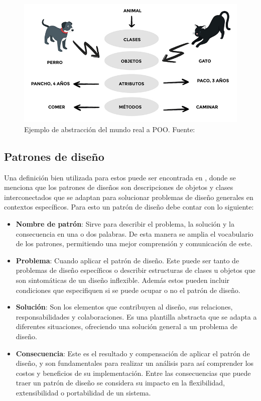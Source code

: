 \begin{figure}[!ht]
	\centering
	\captionsetup{justification=centering}
	\includegraphics[scale=0.6]{images/POO.png}
	\caption[Ejemplo de abstracción del mundo real a POO.]{Ejemplo de abstracción del mundo real a POO. Fuente: \citep{poo_image}}
	\label{fig:poo_image}
\end{figure}

\subsection{Patrones de diseño}
\label{subsec:patrones}

Una definición bien utilizada para estos puede ser encontrada en  \cite{gamma2002patrones}, donde se menciona que los patrones de diseños son descripciones de objetos y clases interconectados que se adaptan para solucionar problemas de diseño generales en contextos específicos. Para esto un patrón de diseño debe contar con lo siguiente: 

\begin{itemize}
    \item \textbf{Nombre de patrón}: Sirve para describir el problema, la solución y la consecuencia en una o dos palabras. De esta manera se amplia el vocabulario de los patrones, permitiendo una mejor comprensión y comunicación de este. 
    \item \textbf{Problema}: Cuando aplicar el patrón de diseño. Este puede ser tanto de problemas de diseño específicos o describir estructuras de clases u objetos que son sintomáticas de un diseño inflexible. Además estos pueden incluir condiciones que especifiquen si se puede ocupar o no el patrón de diseño. 
    \item \textbf{Solución}: Son los elementos que contribuyen al diseño, sus relaciones, responsabilidades y colaboraciones. Es una plantilla abstracta que se adapta a diferentes situaciones, ofreciendo una solución general a un problema de diseño. 
    \item \textbf{Consecuencia}: Este es el resultado y compensación de aplicar el patrón de diseño, y son fundamentales para realizar un análisis para así comprender los costos y beneficios de su implementación. Entre las consecuencias que puede traer un patrón de diseño se considera su impacto en la flexibilidad, extensibilidad o portabilidad de un sistema.
\end{itemize}

